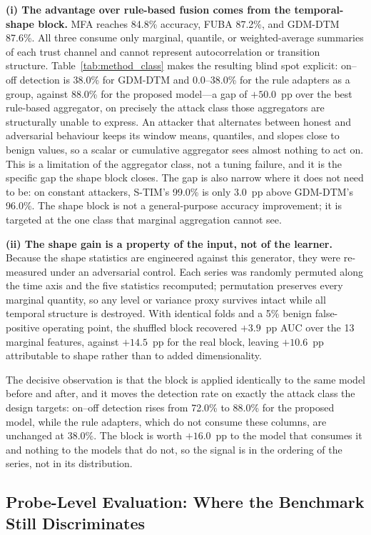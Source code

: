 \documentclass[notspecified,article,submit,moreauthors]{Definitions/mdpi}
\begin{document}
\textbf{(i) The advantage over rule-based fusion comes from the temporal-shape block.} MFA reaches 84.8\% accuracy, FUBA 87.2\%, and GDM-DTM 87.6\%. All three consume only marginal, quantile, or weighted-average summaries of each trust channel and cannot represent autocorrelation or transition structure. Table~\ref{tab:method_class} makes the resulting blind spot explicit: on--off detection is 38.0\% for GDM-DTM and 0.0--38.0\% for the rule adapters as a group, against 88.0\% for the proposed model---a gap of $+50.0$~pp over the best rule-based aggregator, on precisely the attack class those aggregators are structurally unable to express. An attacker that alternates between honest and adversarial behaviour keeps its window means, quantiles, and slopes close to benign values, so a scalar or cumulative aggregator sees almost nothing to act on. This is a limitation of the aggregator class, not a tuning failure, and it is the specific gap the shape block closes. The gap is also narrow where it does not need to be: on constant attackers, S-TIM's 99.0\% is only 3.0~pp above GDM-DTM's 96.0\%. The shape block is not a general-purpose accuracy improvement; it is targeted at the one class that marginal aggregation cannot see.

\textbf{(ii) The shape gain is a property of the input, not of the learner.} Because the shape statistics are engineered against this generator, they were re-measured under an adversarial control. Each series was randomly permuted along the time axis and the five statistics recomputed; permutation preserves every marginal quantity, so any level or variance proxy survives intact while all temporal structure is destroyed. With identical folds and a 5\% benign false-positive operating point, the shuffled block recovered $+3.9$~pp AUC over the 13 marginal features, against $+14.5$~pp for the real block, leaving $+10.6$~pp attributable to shape rather than to added dimensionality.

The decisive observation is that the block is applied identically to the same model before and after, and it moves the detection rate on exactly the attack class the design targets: on--off detection rises from 72.0\% to 88.0\% for the proposed model, while the rule adapters, which do not consume these columns, are unchanged at 38.0\%. The block is worth $+16.0$~pp to the model that consumes it and nothing to the models that do not, so the signal is in the ordering of the series, not in its distribution.

\subsection{Probe-Level Evaluation: Where the Benchmark Still Discriminates}
\label{sec:probe}
\end{document}
